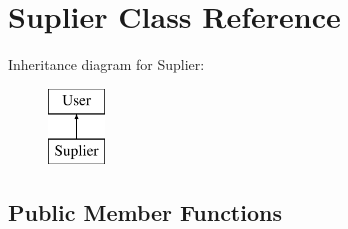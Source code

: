 \hypertarget{class_suplier}{}\section{Suplier Class Reference}
\label{class_suplier}
Inheritance diagram for Suplier\+:\begin{figure}[H]
\begin{center}
\leavevmode
\includegraphics[height=2.000000cm]{class_suplier}
\end{center}
\end{figure}
\subsection*{Public Member Functions}
